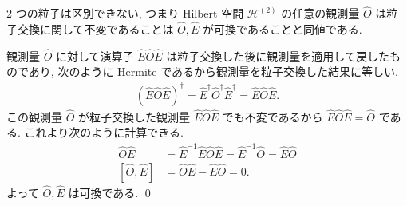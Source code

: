 \documentclass[uplatex,dvipdfmx,a4paper,11pt]{jlreq}
\makeatletter
\newcommand{\HH}{\mathcal{H}}
\numberwithin{equation}{section}
\theoremstyle{definition}
\renewenvironment{proof}[1][\proofname]{\par
  \normalfont
  \topsep6\p@\@plus6\p@ \trivlist
  \item[\hskip\labelsep{\bfseries #1}\@addpunct{\bfseries}]\ignorespaces\quad\par
}{%
  \qed\endtrivlist\@endpefalse
}
\renewcommand\proofname{証明}
\makeatother
\begin{document}
\begin{proposition}[Q21-1(vi)(vii)]
  2 つの粒子は区別できない, つまり Hilbert 空間 $\HH^{(2)}$ の任意の観測量 $\hat{O}$ は粒子交換に関して不変であることは $\hat{O}, \hat{E}$ が可換であることと同値である.
\end{proposition}
\begin{proof}
  観測量 $\hat{O}$ に対して演算子 $\hat{E}\hat{O}\hat{E}$ は粒子交換した後に観測量を適用して戻したものであり, 次のように Hermite であるから観測量を粒子交換した結果に等しい.
  \begin{align}
    (\hat{E}\hat{O}\hat{E})^\dagger = \hat{E}^\dagger\hat{O}^\dagger\hat{E}^\dagger = \hat{E}\hat{O}\hat{E}.
  \end{align}
  この観測量 $\hat{O}$ が粒子交換した観測量 $\hat{E}\hat{O}\hat{E}$ でも不変であるから $\hat{E}\hat{O}\hat{E} = \hat{O}$ である. これより次のように計算できる.
  \begin{align}
    \hat{O}\hat{E}     & = \hat{E}^{-1}\hat{E}\hat{O}\hat{E} = \hat{E}^{-1}\hat{O} = \hat{E}\hat{O} \\
    [\hat{O}, \hat{E}] & = \hat{O}\hat{E} - \hat{E}\hat{O} = 0.
  \end{align}
  よって $\hat{O}, \hat{E}$ は可換である.
\end{proof}
\end{document}
